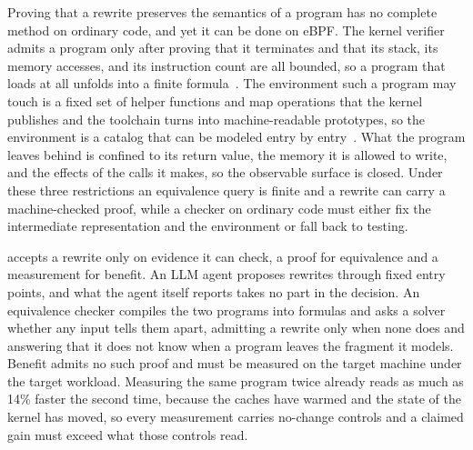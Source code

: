 Proving that a rewrite preserves the semantics of a program has no complete method on ordinary code, and yet it can be done on eBPF.
The kernel verifier admits a program only after proving that it terminates and that its stack, its memory accesses, and its instruction count are all bounded, so a program that loads at all unfolds into a finite formula~\cite{gershuni2019simple,linuxkernel-bpf-verifier}.
The environment such a program may touch is a fixed set of helper functions and map operations that the kernel publishes and the toolchain turns into machine-readable prototypes, so the environment is a catalog that can be modeled entry by entry~\cite{gbadamosi2024ebpf}.
What the program leaves behind is confined to its return value, the memory it is allowed to write, and the effects of the calls it makes, so the observable surface is closed.
Under these three restrictions an equivalence query is finite and a rewrite can carry a machine-checked proof, while a checker on ordinary code must either fix the intermediate representation and the environment or fall back to testing.

\sys accepts a rewrite only on evidence it can check, a proof for equivalence and a measurement for benefit.
An LLM agent proposes rewrites through fixed entry points, and what the agent itself reports takes no part in the decision.
An equivalence checker compiles the two programs into formulas and asks a solver whether any input tells them apart, admitting a rewrite only when none does and answering that it does not know when a program leaves the fragment it models.
Benefit admits no such proof and must be measured on the target machine under the target workload.
Measuring the same program twice already reads as much as 14\% faster the second time, because the caches have warmed and the state of the kernel has moved, so every measurement carries no-change controls and a claimed gain must exceed what those controls read.

